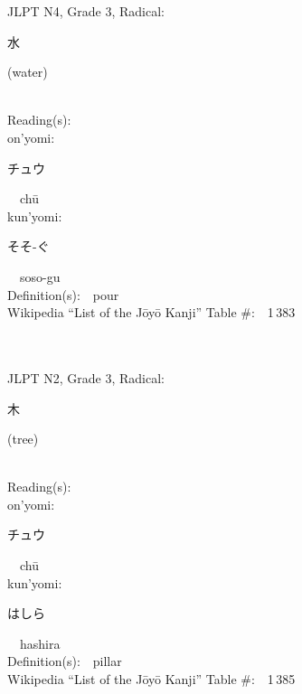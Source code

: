 \begin{multicols}{2}
{JLPT N4, Grade 3, Radical:\ \ {\begin{CJK}{UTF8}{min} 水 \end{CJK}} (water) } \\
Reading(s):\ \ \\
{\hspace*{1em}}on'yomi:\ \ \\
{\hspace*{2em}}{\begin{CJK}{UTF8}{min} チュウ \end{CJK}}\ \ ch\=u\ \ \\
{\hspace*{1em}}kun'yomi:\ \ \\
{\hspace*{2em}}{\begin{CJK}{UTF8}{min} そそ-ぐ \end{CJK}}\ \ soso-gu\ \ \\
Definition(s):\ \ pour \\
Wikipedia ``List of the J\=oy\=o Kanji'' Table \#:\ \ 1\,383 \\
\ \ \\
{\fontsize{34pt}{40pt}  }\ \ \\  %
{JLPT N2, Grade 3, Radical:\ \ {\begin{CJK}{UTF8}{min} 木 \end{CJK}} (tree) } \\
Reading(s):\ \ \\
{\hspace*{1em}}on'yomi:\ \ \\
{\hspace*{2em}}{\begin{CJK}{UTF8}{min} チュウ \end{CJK}}\ \ ch\=u\ \ \\
{\hspace*{1em}}kun'yomi:\ \ \\
{\hspace*{2em}}{\begin{CJK}{UTF8}{min} はしら \end{CJK}}\ \ hashira\ \ \\
Definition(s):\ \ pillar \\
Wikipedia ``List of the J\=oy\=o Kanji'' Table \#:\ \ 1\,385 \\
\ \ \\

\end{multicols}
